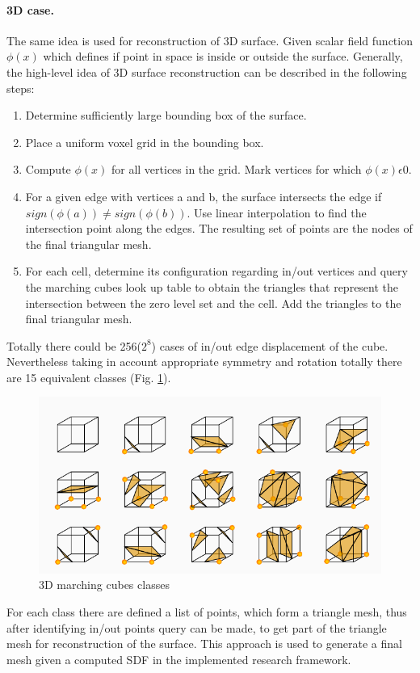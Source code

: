 \paragraph{3D case.}
The same idea is used for reconstruction of 3D surface. Given scalar field function $\phi(x)$ which defines if point in space is inside or outside the surface. Generally, the high-level idea of 3D surface reconstruction can be described in the following steps:
\begin{enumerate}
	\item Determine sufficiently large bounding box of the surface.
	\item Place a uniform voxel grid in the bounding box.
	\item Compute $\phi(x)$ for all vertices in the grid. Mark vertices for which $\phi(x) \epsilon 0$.
	\item For a given edge with vertices a and b, the surface intersects the edge if $sign(\phi(a)) \neq sign(\phi(b))$. Use linear interpolation to find the intersection point along the edges. The resulting set of points are the nodes of the final triangular mesh.
	\item For each cell, determine its configuration regarding in/out vertices and query the marching cubes look up table to obtain the triangles that represent the intersection between the zero level set and the cell. Add the triangles to the final triangular mesh.
\end{enumerate}
Totally there could be 256($2^8$) cases of in/out edge displacement of the cube. Nevertheless taking in account appropriate symmetry and rotation totally there are 15 equivalent classes (Fig. \ref{fig:MC_classes}). 
\begin{figure}[h!]
	\includegraphics[width=\textwidth]{figures/MC_classes.png}
	\caption{3D marching cubes classes}
	\label{fig:MC_classes}
\end{figure}
For each class there are defined a list of points, which form a triangle mesh, thus after identifying in/out points query can be made, to get part of the triangle mesh for reconstruction of the surface. This approach is used to generate a final mesh given a computed SDF in the implemented research framework.
